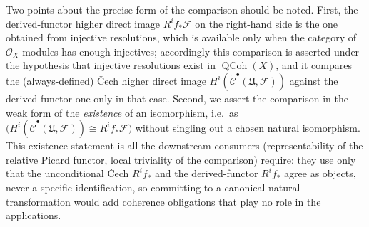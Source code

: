 \begin{lemma}
  Two points about the precise form of the comparison should be noted. First, the
  derived-functor higher direct image \(R^i f_*\mathcal{F}\) on the right-hand side
  is the one obtained from injective resolutions, which is available only when the
  category of \(\mathcal{O}_X\)-modules has enough injectives; accordingly this
  comparison is asserted under the hypothesis that injective resolutions exist in
  \(\operatorname{QCoh}(X)\), and it compares the (always-defined) {\v C}ech higher
  direct image \(H^i(\check{\mathcal{C}}^\bullet(\mathfrak{U}, \mathcal{F}))\)
  against the derived-functor one only in that case. Second, we assert the comparison in the
  weak form of the \emph{existence} of an isomorphism, i.e.\ as
  \(\bigl(H^i(\check{\mathcal{C}}^\bullet(\mathfrak{U}, \mathcal{F})) \cong
  R^i f_*\mathcal{F}\bigr)\) without singling out a chosen natural isomorphism.
  This existence statement is all the downstream consumers (representability of the
  relative Picard functor, local triviality of the comparison) require: they use
  only that the unconditional {\v C}ech \(R^i f_*\) and the derived-functor
  \(R^i f_*\) agree as objects, never a specific identification, so committing to a
  canonical natural transformation would add coherence obligations that play no
  role in the applications.
\end{lemma}

